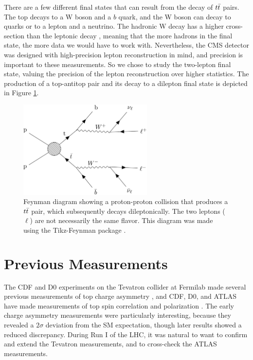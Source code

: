 There are a few different final states that can result from the decay
of $\ttbar$ pairs. The top decays to a W boson and a $b$ quark, and
the W boson can decay to quarks or to a lepton and a neutrino. The
hadronic W decay has a higher cross-section than the leptonic decay \cite{pdg},
meaning that the more hadrons in the final state, the more data we
would have to work with. Nevertheless, the CMS detector was designed
with high-precision lepton reconstruction in mind, and precision is
important to these measurements. So we chose to study the two-lepton
final state, valuing the precision of the lepton reconstruction over
higher statistics. The production of a top-antitop pair and its decay
to a dilepton final state is depicted in Figure
\ref{fig:afb:feynmandiagram}.

\begin{figure}
\centering
\includegraphics[width=0.6\textwidth]{figures/feynmandiagram_afb.pdf}
\caption[Feynman diagram showing a proton-proton collision that
  produces a $\ttbar$ pair, which subsequently decays
  dileptonically. The two leptons ($\ell$) are not necessarily the
  same flavor.]
  {Feynman diagram showing a proton-proton collision that produces
  a $\ttbar$ pair, which subsequently decays dileptonically. The two
  leptons ($\ell$) are not necessarily the same flavor. This
  diagram was made using the Tikz-Feynman package \cite{tikzfeynman}.}
\label{fig:afb:feynmandiagram}
\end{figure}

\section{Previous Measurements}
\label{sec:afb:tevatron}

The CDF and D0 experiments on the Tevatron collider at Fermilab made
several previous measurements of top charge asymmetry
\cite{cdfchargeasym1,d0chargeasym1, cdfchargeasym2,d0chargeasym2}, and
CDF, D0, and ATLAS have made measurements of top spin correlation and
polarization
\cite{cdfspincorr,d0spincorr1,d0spincorr2,d0pol,atlaspol,atlasspincorr}. The
early charge asymmetry measurements
\cite{cdfchargeasym1,d0chargeasym1} were particularly interesting,
because they revealed a $2\sigma$ deviation from the SM expectation,
though later results \cite{cdfchargeasym2,d0chargeasym2} showed a
reduced discrepancy. During Run I of the LHC, it was natural to want to
confirm and extend the Tevatron measurements, and to cross-check the
ATLAS measurements.

